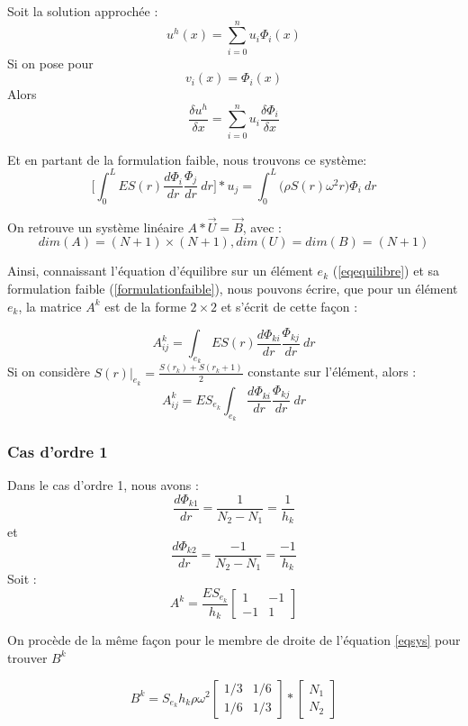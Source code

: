 \documentclass[a4paper,10pt]{report} %
\begin{document}
Soit la solution approchée :
$$u^{h}(x)=\sum_{i=0}^{n}u_{i}\Phi_{i}(x)$$
Si on pose pour $$v_i(x)=\Phi_{i}(x)$$ Alors $$\frac{\delta u^h}{\delta x}=\sum_{i=0}^{n}u_{i}\frac{\delta \Phi_{i}}{\delta x}$$ 

Et en partant de la formulation faible, nous trouvons ce système:
\begin{equation}
	\Big[ \int_0^L \!ES(r)\frac{d\Phi_{i}}{dr}\frac{\Phi_{j}}{dr}~dr \Big]*u_j=\int_0^L \! \big(\rho S(r)\omega^2r\big)\Phi_{i}~dr
	\label{eqsys}
\end{equation}

On retrouve un système linéaire $A*\vec{U}=\vec{B}$, avec :
$$dim (A) = (N+1)\times(N+1), dim (U)=dim(B)=(N+1)$$

Ainsi, connaissant l'équation d'équilibre sur un élément $e_k$ (\ref{eqequilibre}) et sa formulation faible (\ref{formulationfaible}), nous pouvons écrire, que pour un élément $e_k$, la matrice $A^k$ est de la forme $2\times2$ et s'écrit de cette façon :

\begin{equation}
	A^k_{ij}=\int_{e_k} \!ES(r)\frac{d\Phi_{ki}}{dr}\frac{\Phi_{kj}}{dr}~dr
\end{equation}
Si on considère $S(r)|_{e_k}=\frac{S(r_k)+S(r_k+1)}{2}$ constante sur l'élément, alors :
\begin{equation}
	A^k_{ij}=ES_{e_k} \int_{e_k} \frac{d\Phi_{ki}}{dr}\frac{\Phi_{kj}}{dr}~dr
	\label{matrixA}
\end{equation}



\subsubsection{Cas d'ordre 1}
Dans le cas d'ordre 1, nous avons :
	$$\frac{d\Phi_{k1}}{dr}=\frac{1}{N_2-N_1}=\dfrac{1}{h_k}$$
	et
	$$\frac{d\Phi_{k2}}{dr}=\frac{-1}{N_2-N_1}=\dfrac{-1}{h_k}$$
Soit :
\begin{equation}
	A^k=\frac{ES_{e_k}}{h_k}\begin{bmatrix}
    1 & -1 \\
    -1 & 1
  \end{bmatrix}
\end{equation}
	
On procède de la même façon pour le membre de droite de l'équation \ref{eqsys} pour trouver $B^k$

\begin{equation}
	B^k = S_{e_k}h_k\rho\omega^2 \begin{bmatrix}
    1/3 & 1/6 \\
    1/6 & 1/3
  \end{bmatrix}*
\begin{bmatrix}
    N_1 \\
    N_2 
  \end{bmatrix}  
\end{equation}
\end{document}
